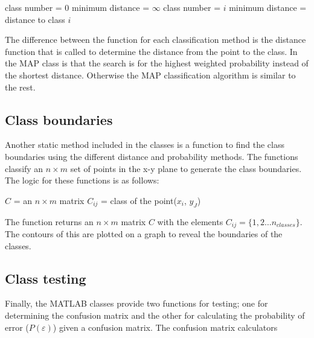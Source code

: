 \begin{algorithmic}
\STATE class number = 0
\STATE minimum distance = $\infty$
\STATE class number = $i$
\STATE minimum distance = distance to class $i$
\ENDIF
\ENDFOR
\end{algorithmic}

The difference between the function for each classification method is the
distance function that is called to determine the distance from the point to
the class. In the MAP class is that the search is for the highest weighted
probability instead of the shortest distance. Otherwise the MAP classification algorithm is similar to the rest.

\subsection{Class boundaries}
Another static method included in the classes is a function to find the class
boundaries using the different distance and probability methods. The
functions classify an $n \times m$ set of points in the x-y plane to generate
the class boundaries. The logic for these functions is as follows:

\begin{algorithmic}
\STATE $C$ = an $n \times m$ matrix
$C_{ij}$ = class of the point($x_i$, $y_J$)
\ENDFOR
\ENDFOR
\end{algorithmic}

The function returns an $n \times m$ matrix $C$ with the elements $C_{ij} =
\{ 1,2 \ldots n_{classes} \}$. The contours of this are plotted on a graph to
reveal the boundaries of the classes.

\subsection{Class testing}
Finally, the MATLAB classes provide two functions for testing; one for
determining the confusion matrix and the other for calculating the probability
of error ($P(\varepsilon)$) given a confusion matrix. The confusion matrix
calculators 
